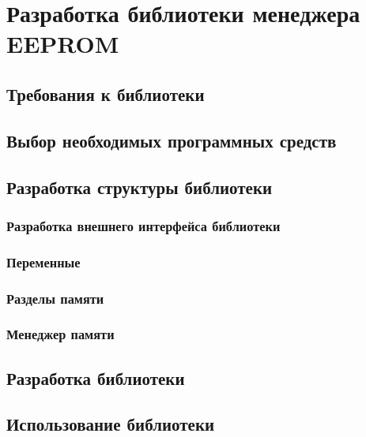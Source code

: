 \chapter{Разработка библиотеки менеджера EEPROM}

\section{Требования к библиотеки}

\section{Выбор необходимых программных средств}

\section{Разработка структуры библиотеки}

\subsection{Разработка внешнего интерфейса библиотеки}

\subsection{Переменные}

\subsection{Разделы памяти}

\subsection{Менеджер памяти}

\section{Разработка библиотеки}

\section{Использование библиотеки}
